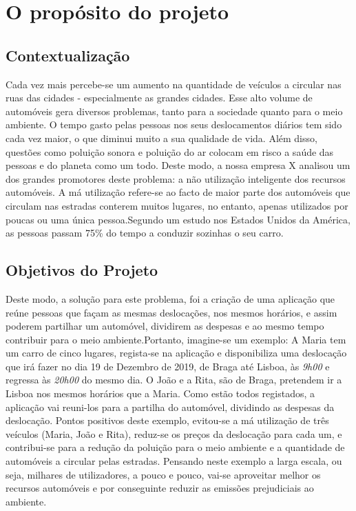 \chapter{O propósito do projeto}

\section{Contextualização}

Cada vez mais percebe-se um aumento na quantidade de veículos a circular nas ruas das cidades - especialmente as grandes cidades. Esse alto volume de automóveis gera diversos problemas, tanto para a sociedade quanto para o meio ambiente. \newline O tempo gasto pelas pessoas nos seus deslocamentos diários tem sido cada vez maior, o que diminui muito a sua qualidade de vida. Além disso, questões como poluição sonora e poluição do ar colocam em risco a saúde das pessoas e do planeta como um todo. \newline Deste modo, a nossa empresa X analisou um dos grandes promotores deste problema: a não utilização inteligente dos recursos automóveis. \newline A má utilização refere-se ao facto de maior parte dos automóveis que circulam nas estradas conterem muitos lugares, no entanto, apenas utilizados por poucas ou uma única pessoa.\newline Segundo um estudo nos Estados Unidos da América, as pessoas passam 75\% do tempo a conduzir sozinhas o seu carro.

\section{Objetivos do Projeto}

Deste modo, a solução para este problema, foi a criação de uma aplicação que reúne pessoas que façam as mesmas deslocações, nos mesmos horários, e assim poderem partilhar um automóvel, dividirem as despesas e ao mesmo tempo contribuir para o meio ambiente.\newline \newline Portanto, imagine-se um exemplo: A Maria tem um carro de cinco lugares, regista-se na aplicação e disponibiliza uma deslocação que irá fazer no dia 19 de Dezembro de 2019, de Braga até Lisboa, às \emph{9h00} e regressa às \emph{20h00} do mesmo dia. \newline O João e a Rita, são de Braga, pretendem ir a Lisboa nos mesmos horários que a Maria. Como estão todos  registados, a aplicação vai reuni-los para a partilha do automóvel, dividindo as despesas da deslocação. \newline Pontos positivos deste exemplo, evitou-se a má utilização de três veículos (Maria, João e Rita), reduz-se os preços da deslocação para cada um, e contribui-se para a redução da poluição para o meio ambiente e a quantidade de automóveis a circular pelas estradas. Pensando neste exemplo a larga escala, ou seja, milhares de utilizadores, a pouco e pouco, vai-se aproveitar melhor os recursos automóveis e por conseguinte reduzir as emissões prejudiciais ao ambiente.